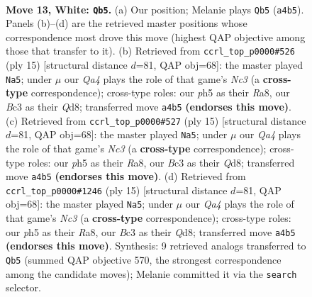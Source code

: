 \documentclass[11pt]{article}
\begin{document}
\clearpage

\begin{figure}[p]\centering
\begin{subfigure}{0.46\textwidth}\centering
\resizebox{\linewidth}{!}{%
\newchessgame
\chessboard[
  setfen={r1b2r2/p1ppqppk/1pn1pn2/2P4p/Q2P4/2B2NP1/PP1KPP1P/R4B1R w - - 0 13},
  showmover=false,
  pgfstyle=straightmove, color=movearrow, markmove={a4-b5}
]}
\caption{}
\end{subfigure}\hfill
\begin{subfigure}{0.46\textwidth}\centering
\resizebox{\linewidth}{!}{%
\newchessgame
\chessboard[
  setfen={r1bqk2r/ppp2pp1/2n1pb1p/3p4/2PP4/1QN1PN2/PP3PPP/R3KB1R b KQkq - 1 8},
  showmover=false,
  pgfstyle=straightmove, color=movearrow, markmove={c6-a5}
]}
\caption{}
\end{subfigure}
\\[4pt]
\begin{subfigure}{0.46\textwidth}\centering
\resizebox{\linewidth}{!}{%
\newchessgame
\chessboard[
  setfen={r1bqk2r/ppp2pp1/2n1pb1p/3p4/2PP4/1QN1PN2/PP3PPP/R3KB1R b KQkq - 1 8},
  showmover=false,
  pgfstyle=straightmove, color=movearrow, markmove={c6-a5}
]}
\caption{}
\end{subfigure}\hfill
\begin{subfigure}{0.46\textwidth}\centering
\resizebox{\linewidth}{!}{%
\newchessgame
\chessboard[
  setfen={r1bqk2r/ppp2pp1/2n1pb1p/3p4/2PP4/1QN1PN2/PP3PPP/R3KB1R b KQkq - 1 8},
  showmover=false,
  pgfstyle=straightmove, color=movearrow, markmove={c6-a5}
]}
\caption{}
\end{subfigure}
\caption{\textbf{Move 13, White: \texttt{Qb5}.} (a) Our position; Melanie plays \texttt{Qb5} (\texttt{a4b5}). Panels (b)--(d) are the retrieved master positions whose correspondence most drove this move (highest QAP objective among those that transfer to it). (b) Retrieved from \texttt{ccrl\_top\_p0000\#526} (ply 15) [structural distance $d$=81, QAP obj=68]: the master played \texttt{Na5}; under $\mu$ our \emph{Qa4} plays the role of that game's \emph{Nc3} (a \textbf{cross-type} correspondence); cross-type roles: our \emph{p}h5 as their \emph{R}a8, our \emph{B}c3 as their \emph{Q}d8; transferred move \texttt{a4b5} \textbf{(endorses this move)}. (c) Retrieved from \texttt{ccrl\_top\_p0000\#527} (ply 15) [structural distance $d$=81, QAP obj=68]: the master played \texttt{Na5}; under $\mu$ our \emph{Qa4} plays the role of that game's \emph{Nc3} (a \textbf{cross-type} correspondence); cross-type roles: our \emph{p}h5 as their \emph{R}a8, our \emph{B}c3 as their \emph{Q}d8; transferred move \texttt{a4b5} \textbf{(endorses this move)}. (d) Retrieved from \texttt{ccrl\_top\_p0000\#1246} (ply 15) [structural distance $d$=81, QAP obj=68]: the master played \texttt{Na5}; under $\mu$ our \emph{Qa4} plays the role of that game's \emph{Nc3} (a \textbf{cross-type} correspondence); cross-type roles: our \emph{p}h5 as their \emph{R}a8, our \emph{B}c3 as their \emph{Q}d8; transferred move \texttt{a4b5} \textbf{(endorses this move)}. Synthesis: 9 retrieved analogs transferred to \texttt{Qb5} (summed QAP objective 570, the strongest correspondence among the candidate moves); Melanie committed it via the \texttt{search} selector.}

\end{figure}
\end{document}
